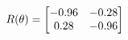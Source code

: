 \documentclass[preview]{standalone}
\begin{document}
\begin{align*}
\special{dvisvgm:raw <g id='unique000'>}R(\theta) = \begin{bmatrix}-0.96 & -0.28\\0.28 & -0.96\end{bmatrix}\special{dvisvgm:raw </g>}
\end{align*}
\end{document}
